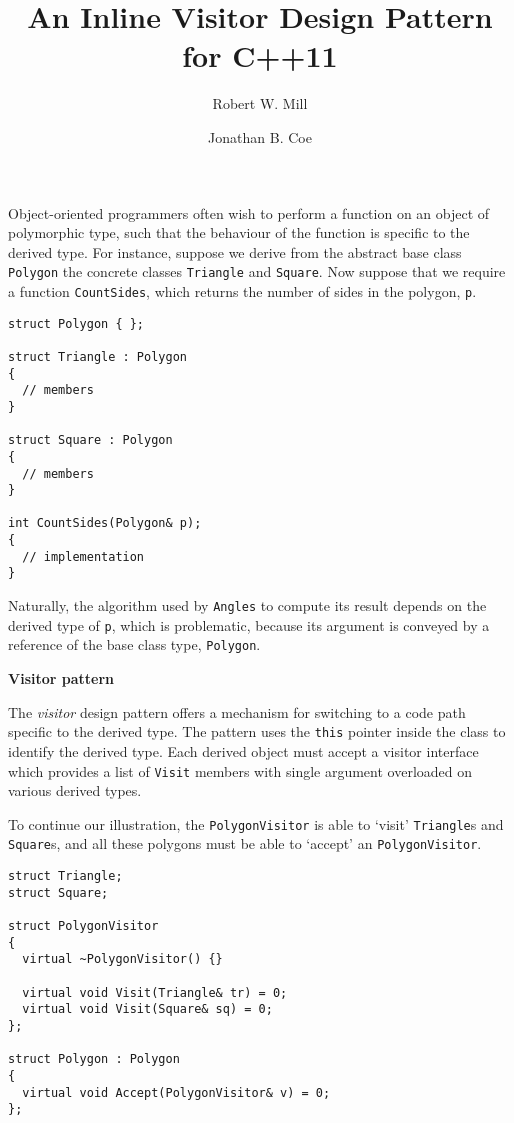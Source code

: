 \documentclass[10pt,a4paper,twocolumn]{article}
\title{An Inline Visitor Design Pattern for C++11}
\author{Robert W. Mill \and Jonathan B. Coe}
\renewcommand\section[1]{
    \begin{minipage}[c]{0.94\linewidth}
    \large \raggedright \sffamily \textbf{#1}
    \end{minipage}
}
\newcommand\mycode[1]{{\small\texttt{#1}}}
\begin{document}
\maketitle

Object-oriented programmers often wish to perform a function on an object of polymorphic type, such that the behaviour of the function is specific to the derived type. For instance, suppose we derive from the abstract base class \mycode{Polygon} the concrete classes \mycode{Triangle} and \mycode{Square}. Now suppose that we require a function \mycode{CountSides}, which returns the number of sides in the polygon, \mycode{p}.

{\small\begin{verbatim}
struct Polygon { };

struct Triangle : Polygon
{
  // members
}

struct Square : Polygon
{
  // members
}

int CountSides(Polygon& p);
{
  // implementation
}
\end{verbatim}}

Naturally, the algorithm used by \mycode{Angles} to compute its result depends on the derived type of \mycode{p}, which is problematic, because its argument is conveyed by a reference of the base class type, \mycode{Polygon}.

\section{Visitor pattern}

The \emph{visitor} design pattern offers a mechanism for switching to a code path specific to the derived type. The pattern uses the \mycode{this} pointer inside the class to identify the derived type. Each derived object must accept a visitor interface which provides a list of \mycode{Visit} members with single argument overloaded on various derived types.

To continue our illustration, the \mycode{PolygonVisitor} is able to `visit' \mycode{Triangle}s and \mycode{Square}s, and all these polygons must be able to `accept' an \mycode{PolygonVisitor}.

{\small\begin{verbatim}
struct Triangle;
struct Square;

struct PolygonVisitor
{
  virtual ~PolygonVisitor() {}

  virtual void Visit(Triangle& tr) = 0;
  virtual void Visit(Square& sq) = 0;
};

struct Polygon : Polygon
{
  virtual void Accept(PolygonVisitor& v) = 0;
};
\end{verbatim}}
\end{document}
